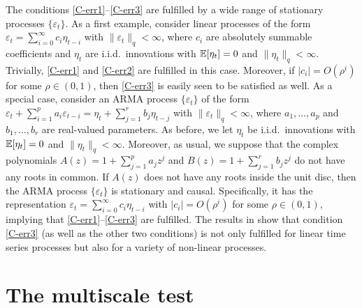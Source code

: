 The conditions \ref{C-err1}--\ref{C-err3} are fulfilled by a wide range of stationary processes $\{\varepsilon_t\}$. As a first example, consider linear processes of the form $\varepsilon_t = \sum\nolimits_{i=0}^{\infty} c_i \eta_{t-i}$ with $\| \varepsilon_t \|_q < \infty$, where $c_i$ are absolutely summable coefficients and $\eta_t$ are i.i.d.\ innovations with $\mathbb{E}[\eta_t] = 0$ and $\| \eta_t\|_q < \infty$. Trivially, \ref{C-err1} and \ref{C-err2} are fulfilled in this case. Moreover, if $|c_i| = O(\rho^i)$ for some $\rho \in (0,1)$, then \ref{C-err3} is easily seen to be satisfied as well. As a special case, consider an ARMA process $\{\varepsilon_t\}$ of the form $\varepsilon_t + \sum\nolimits_{i=1}^p a_i \varepsilon_{t-i} = \eta_t + \sum\nolimits_{j=1}^r b_j \eta_{t-j}$  with $\| \varepsilon_t \|_q < \infty$, where $a_1,\ldots,a_p$ and $b_1,\ldots,b_r$ are real-valued parameters. As before, we let $\eta_t$ be i.i.d.\ innovations with $\mathbb{E}[\eta_t] = 0$ and $\| \eta_t\|_q < \infty$. Moreover, as usual, we suppose that the complex polynomials $A(z) = 1 + \sum\nolimits_{j=1}^p a_jz^j$ and $B(z) = 1 + \sum\nolimits_{j=1}^r b_jz^j$ do not have any roots in common. If $A(z)$ does not have any roots inside the unit disc, then the ARMA process $\{ \varepsilon_t \}$ is stationary and causal. Specifically, it has the representation $\varepsilon_t = \sum\nolimits_{i=0}^{\infty} c_i \eta_{t-i}$ with $|c_i| = O(\rho^i)$ for some $\rho \in (0,1)$, implying that \ref{C-err1}--\ref{C-err3} are fulfilled. The results in \cite{WuShao2004} show that condition \ref{C-err3} (as well as the other two conditions) is not only fulfilled for linear time series processes but also for a variety of non-linear processes. 



\section{The multiscale test}\label{sec-method}


